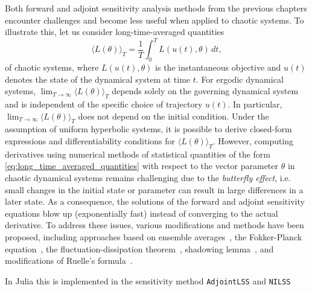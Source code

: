 Both forward and adjoint sensitivity analysis methods from the previous chapters encounter challenges and become less useful when applied to chaotic systems.
To illustrate this, let us consider long-time-averaged quantities 
\begin{equation}\label{eq:long_time_averaged_quantities}
    \langle L(\theta) \rangle_T = \frac{1}{T} \int_0^T L(u(t), \theta) \, dt, 
\end{equation}
of chaotic systems, where $L(u(t), \theta)$ is the instantaneous objective and $u(t)$ denotes the state of the dynamical system at time $t$.
For ergodic dynamical systems, $\lim_{T\to\infty} \langle L(\theta) \rangle_T$ depends solely on the governing dynamical system and is independent of the specific choice of trajectory $u(t)$. 
In particular, $\lim_{T\to\infty} \langle L(\theta) \rangle_T$ does not depend on the initial condition. 
Under the assumption of uniform hyperbolic systems, it is possible to derive closed-form expressions and differentiability conditions for $ \langle L(\theta) \rangle_T$\cite{ruelle1997differentiation,ruelle2009review}. 
However, computing derivatives using numerical methods of statistical quantities of the form \eqref{eq:long_time_averaged_quantities} with respect to the vector parameter $\theta$ in chaotic dynamical systems remains challenging due to the \textit{butterfly effect}, i.e. small changes in the initial state or parameter can result in large differences in a later state. 
As a consequence, the solutions of the forward and adjoint sensitivity equations blow up (exponentially fast) instead of converging to the actual derivative.
To address these issues, various modifications and methods have been proposed, including approaches based on ensemble averages~\cite{lea2000sensitivity, eyink2004ruelle}, the Fokker-Planck equation~\cite{thuburn2005climate, blonigan2014probability}, the fluctuation-dissipation theorem~\cite{leith1975climate, abramov2007blended, abramov2008new}, shadowing lemma~\cite{wang2013forward, wang2014least, wang2014convergence, ni2017sensitivity, blonigan2017adjoint, blonigan2018multiple, ni2019adjoint, ni2019sensitivity}, and modifications of Ruelle's formula~\cite{chandramoorthy2022efficient, ni2020fast}.

In Julia this is implemented in the sensitivity method \texttt{AdjointLSS} and \texttt{NILSS}